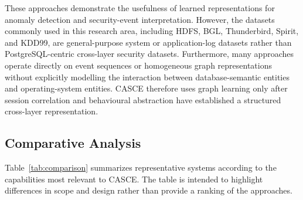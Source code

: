 \documentclass[conference]{IEEEtran}
\begin{document}
These approaches demonstrate the usefulness of learned representations for anomaly detection and security-event interpretation. However, the datasets commonly used in this research area, including HDFS, BGL, Thunderbird, Spirit, and KDD99, are general-purpose system or application-log datasets rather than PostgreSQL-centric cross-layer security datasets. Furthermore, many approaches operate directly on event sequences or homogeneous graph representations without explicitly modelling the interaction between database-semantic entities and operating-system entities. CASCE therefore uses graph learning only after session correlation and behavioural abstraction have established a structured cross-layer representation.

\subsection{Comparative Analysis}

Table~\ref{tab:comparison} summarizes representative systems according to the capabilities most relevant to CASCE. The table is intended to highlight differences in scope and design rather than provide a ranking of the approaches.
\end{document}

